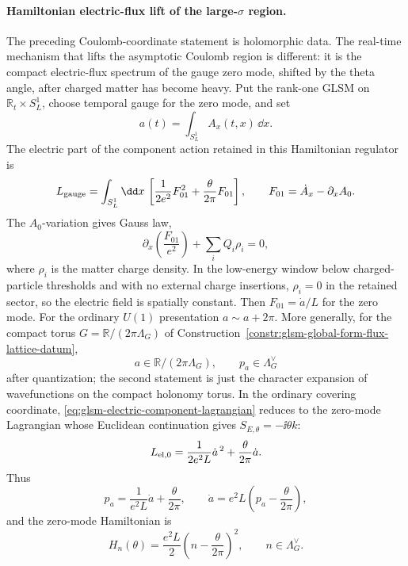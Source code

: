 \paragraph{Hamiltonian electric-flux lift of the large-\(\sigma\) region.}
The preceding Coulomb-coordinate statement is holomorphic data.  The real-time
mechanism that lifts the asymptotic Coulomb region is different: it is the
compact electric-flux spectrum of the gauge zero mode, shifted by the theta
angle, after charged matter has become heavy.  Put the rank-one GLSM on
\(\mathbb R_t\times S^1_L\), choose temporal gauge for the zero mode, and set
\[
  a(t)=\int_{S^1_L} A_x(t,x)\,\dd x .
\]
The electric part of the component action retained in this Hamiltonian
regulator is
\begin{equation}
  L_{\rm gauge}
  =
  \int_{S^1_L}\dd x\,
  \left[
    \frac{1}{2e^2}F_{01}^2
    +\frac{\theta}{2\pi}F_{01}
  \right],
  \qquad
  F_{01}=\dot A_x-\partial_xA_0 .
  \label{eq:glsm-electric-component-lagrangian}
\end{equation}
The \(A_0\)-variation gives Gauss law,
\[
  \partial_x\left(\frac{F_{01}}{e^2}\right)
  +\sum_iQ_i\rho_i=0,
\]
where \(\rho_i\) is the matter charge density.  In the low-energy window
below charged-particle thresholds and with no external charge insertions,
\(\rho_i=0\) in the retained sector, so the electric field is spatially
constant.  Then \(F_{01}=\dot a/L\) for the zero mode.
For the ordinary \(U(1)\) presentation \(a\sim a+2\pi\).  More generally, for
the compact torus \(G=\mathbb R/(2\pi\Lambda_G)\) of
Construction~\ref{constr:glsm-global-form-flux-lattice-datum},
\[
  a\in \mathbb R/(2\pi\Lambda_G),
  \qquad
  p_a\in \Lambda_G^\vee
\]
after quantization; the second statement is just the character expansion of
wavefunctions on the compact holonomy torus.  In the ordinary covering
coordinate, \eqref{eq:glsm-electric-component-lagrangian} reduces to the
zero-mode Lagrangian whose Euclidean continuation gives
\(S_{E,\theta}=-\ii\theta k\):
\begin{equation}
  L_{\rm el,0}
  =
  \frac{1}{2e^2L}\dot a^{\,2}
  +\frac{\theta}{2\pi}\dot a .
  \label{eq:glsm-electric-holonomy-lagrangian}
\end{equation}
Thus
\begin{equation}
  p_a
  =
  \frac{1}{e^2L}\dot a+\frac{\theta}{2\pi},
  \qquad
  \dot a=e^2L\left(p_a-\frac{\theta}{2\pi}\right),
  \label{eq:glsm-electric-theta-shifted-momentum}
\end{equation}
and the zero-mode Hamiltonian is
\begin{equation}
  H_n(\theta)
  =
  \frac{e^2L}{2}
  \left(n-\frac{\theta}{2\pi}\right)^2,
  \qquad n\in\Lambda_G^\vee .
  \label{eq:glsm-electric-flux-sector-energy}
\end{equation}
